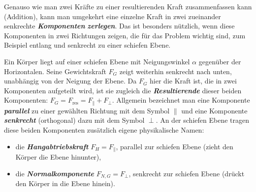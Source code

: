 \documentclass[addpoints,11pt,a4paper]{exam}
\newlength{\antwortraumlen}
\newcommand{\Antwortraum}[1]{%
  \pgfmathsetlength{\antwortraumlen}{#1*2.5cm}%
  \begin{answerbox}
    \rule{0pt}{\antwortraumlen}%
  \end{answerbox}%
}
\begin{document}
\begin{questions}
\begin{taskbox}
\end{taskbox}
\end{questions}

\begin{theoriebox}
Genauso wie man zwei Kräfte zu einer resultierenden Kraft zusammenfassen
kann (Addition), kann man umgekehrt eine einzelne Kraft in zwei zueinander
senkrechte \textbf{\emph{Komponenten}} \textbf{\emph{zerlegen}}. Das ist
besonders nützlich, wenn diese Komponenten in zwei Richtungen zeigen, die
für das Problem wichtig sind, zum Beispiel entlang und senkrecht zu einer
schiefen Ebene.

Ein Körper liegt auf einer schiefen Ebene mit Neigungswinkel $\alpha$
gegenüber der Horizontalen. Seine Gewichtskraft $F_G$ zeigt weiterhin
senkrecht nach unten, unabhängig von der Neigung der Ebene. Da $F_G$ hier
die Kraft ist, die in zwei Komponenten aufgeteilt wird, ist sie zugleich
die \textbf{\emph{Resultierende}} dieser beiden Komponenten:
$F_G = F_{\text{res}} = F_\parallel + F_\perp$. Allgemein bezeichnet man
eine Komponente \textbf{\emph{parallel}} zu einer gewählten Richtung mit
dem Symbol $\parallel$ und eine Komponente \textbf{\emph{senkrecht}}
(orthogonal) dazu mit dem Symbol $\perp$. An der schiefen Ebene tragen
diese beiden Komponenten zusätzlich eigene physikalische Namen:
\begin{itemize}[leftmargin=1.2cm,itemsep=0.2em]
  \item die \textbf{\emph{Hangabtriebskraft}} $F_H = F_\parallel$, parallel
  zur schiefen Ebene (zieht den Körper die Ebene hinunter),
  \item die \textbf{\emph{Normalkomponente}} $F_{N,G} = F_\perp$, senkrecht
  zur schiefen Ebene (drückt den Körper in die Ebene hinein).
\end{itemize}


\end{theoriebox}
\end{document}
